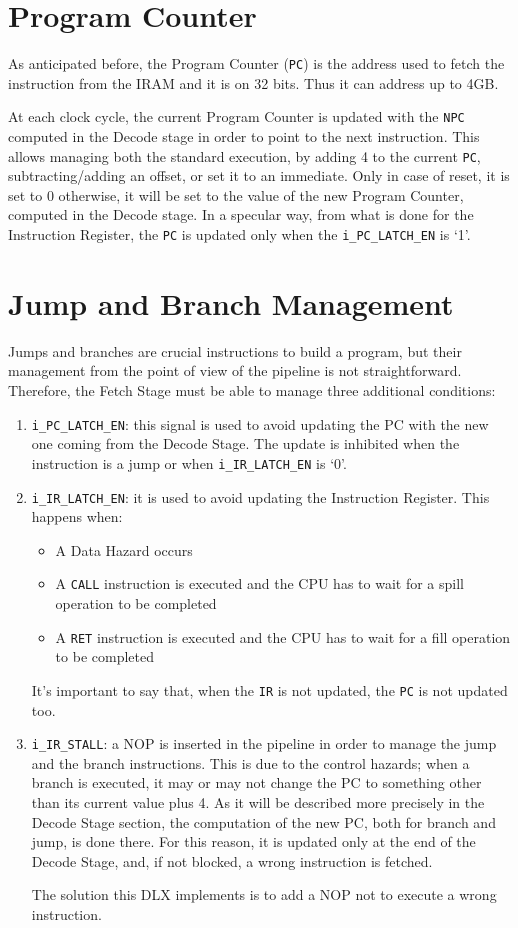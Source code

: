 \section{Program Counter}
As anticipated before, the Program Counter (\texttt{PC}) is the address used to fetch the instruction from the IRAM and it is on 32 bits. Thus it can address up to 4GB.

At each clock cycle, the current Program Counter is updated with the \texttt{NPC} computed in the Decode stage in order to point to the next instruction. This allows managing both the standard execution, by adding 4 to the current \texttt{PC}, subtracting/adding an offset, or set it to an immediate. Only in case of reset, it is set to 0 otherwise, it will be set to the value of the new Program Counter, computed in the Decode stage. In a specular way, from what is done for the Instruction Register, the \texttt{PC} is updated only when the \texttt{i\_PC\_LATCH\_EN} is `1'.

\section{Jump and Branch Management}
\label{sec:jmp_branch}
Jumps and branches are crucial instructions to build a program, but their management from the point of view of the pipeline is not straightforward. Therefore, the Fetch Stage must be able to manage three additional conditions:
\begin{enumerate}
    \item \texttt{i\_PC\_LATCH\_EN}: this signal is used to avoid updating the PC with the new one coming from the Decode Stage. The update is inhibited when the instruction is a jump or when \texttt{i\_IR\_LATCH\_EN} is `0'. 
    \item \texttt{i\_IR\_LATCH\_EN}: it is used to avoid updating the Instruction Register. This happens when:
    \begin{itemize}
        \item A Data Hazard occurs
        \item A \texttt{CALL} instruction is executed and the CPU has to wait for a spill operation to be completed
        \item A \texttt{RET} instruction is executed and the CPU has to wait for a fill operation to be completed
    \end{itemize}
    It's important to say that, when the \texttt{IR} is not updated, the \texttt{PC} is not updated too.
    \item \texttt{i\_IR\_STALL}: a NOP is inserted in the pipeline in order to manage the jump and the branch instructions. This is due to the control hazards; when a branch is executed, it may or may not change the PC to something other than its current value plus 4. As it will be described more precisely in the Decode Stage section, the computation of the new PC, both for branch and jump, is done there. For this reason, it is updated only at the end of the Decode Stage, and, if not blocked, a wrong instruction is fetched.
    
    The solution this DLX implements is to add a NOP not to execute a wrong instruction.
\end{enumerate}